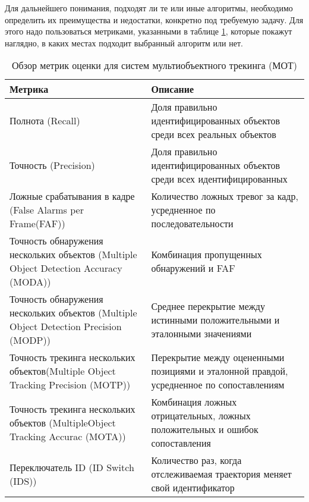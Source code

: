 Для дальнейшего понимания, подходят ли те или иные алгоритмы, необходимо определить их преимущества и недостатки, конкретно под требуемую задачу. Для этого надо пользоваться метриками, указанными в таблице \ref{tab::metrics}, которые покажут наглядно, в каких местах подходит выбранный алгоритм или нет.

\begin{table}[H]
	\centering
	\caption{Обзор метрик оценки для систем мультиобъектного трекинга (МОТ)}
	\label{tab::metrics}
	\begin{tabularx}{\textwidth}{|X|X|}
		\hline
		Метрика & Описание\\ 
		\hline
		Полнота (Recall) & Доля правильно идентифицированных объектов среди всех реальных объектов \\
		\hline
		Точность (Precision) & Доля правильно идентифицированных объектов среди всех идентифицированных\\
		\hline
		Ложные срабатывания в кадре (False Alarms per Frame(FAF)) & Количество ложных тревог за кадр, усредненное по последовательности \\
		\hline
		Точность обнаружения нескольких объектов (Multiple Object Detection Accuracy (MODA)) & Комбинация пропущенных обнаружений и FAF \\
		\hline
		Точность обнаружения нескольких объектов (Multiple Object Detection Precision (MODP)) & Среднее перекрытие между истинными положительными и эталонными значениями \\
		\hline
		Точность трекинга нескольких объектов(Multiple Object Tracking Precision (MOTP)) & 
		Перекрытие между оцененными позициями и эталонной правдой, усредненное по сопоставлениям  \\ 
		\hline
		Точность трекинга нескольких объектов (MultipleObject Tracking Accurac (MOTA)) & Комбинация ложных отрицательных, ложных положительных и ошибок сопоставления \\
		\hline
		Переключатель ID (ID Switch (IDS)) & Количество раз, когда отслеживаемая траектория меняет свой идентификатор \\
		\hline
	\end{tabularx}
\end{table}
